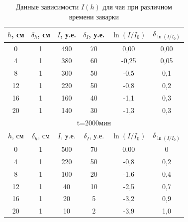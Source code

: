 \documentclass[a4paper, 12pt]{article}%
\begin{document}
\begin{table}[h]
\begin{center}
\begin{tabular}{|c|c|c|c|c|c|}
$h$, см & $\delta_h$, см & $I$, у.е. & $\delta_I$, у.е. & $\ln(I/I_0)$ & $\delta_{\ln(I/I_0)}$ \\ \hline
0       & 1              & 490       & 70               & 0,00         & 0,00                  \\ \hline
4       & 1              & 380       & 60               & -0,25        & 0,05                  \\ \hline
8       & 1              & 300       & 50               & -0,5         & 0,1                   \\ \hline
12      & 1              & 220       & 50               & -0,8         & 0,2                   \\ \hline
16      & 1              & 160       & 40               & -1,1         & 0,3                   \\ \hline
20      & 1              & 140       & 30               & -1,3         & 0,3                   \\ \hline
\multicolumn{6}{|c|}{t=2000мин}                                                                \\ \hline
$h$, см & $\delta_h$, см & $I$, у.е. & $\delta_I$, у.е. & $\ln(I/I_0)$ & $\delta_{\ln(I/I_0)}$ \\ \hline
0       & 1              & 500       & 70               & 0,00         & 0                     \\ \hline
4       & 1              & 220       & 50               & -0,8         & 0,2                   \\ \hline
8       & 1              & 100       & 20               & -1,6         & 0,4                   \\ \hline
12      & 1              & 40        & 10               & -2,5         & 0,7                   \\ \hline
16      & 1              & 20        & 5                & -3,2         & 0,9                   \\ \hline
20      & 1              & 10        & 2                & -3,9         & 1,0                   \\ \hline
\end{tabular}
\caption{Данные зависимости $I(h)$ для чая при различном времени заварки}	
\end{center}
\end{table}
\newpage
\end{document}

